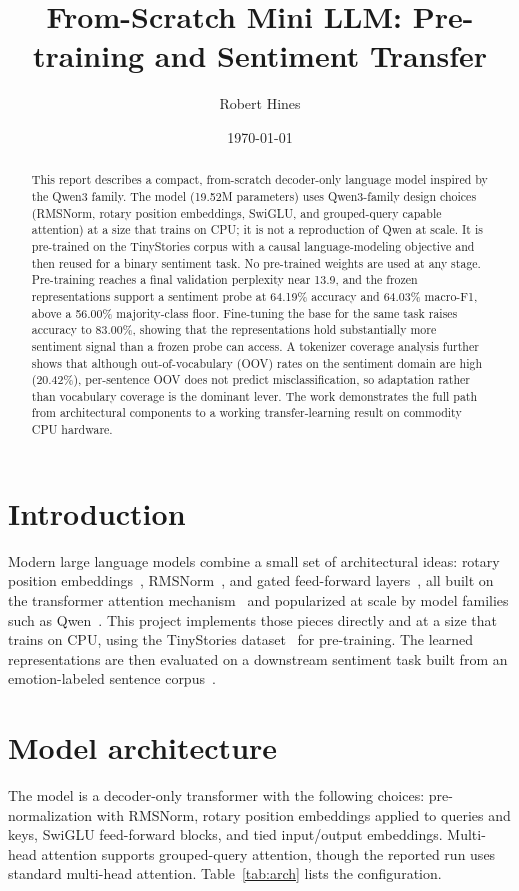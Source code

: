 \documentclass[11pt]{article}
\title{From-Scratch Mini LLM: Pre-training and Sentiment Transfer}
\author{Robert Hines}
\date{\today}
\begin{document}
\maketitle

\begin{abstract}
This report describes a compact, from-scratch decoder-only language model
inspired by the Qwen3 family. The model (19.52M parameters) uses Qwen3-family
design choices (RMSNorm, rotary position embeddings, SwiGLU, and grouped-query
capable attention) at a size that trains on CPU; it is not a reproduction of Qwen
at scale. It is pre-trained on the TinyStories corpus with a causal
language-modeling objective and then reused for a binary sentiment task. No
pre-trained weights are used at any stage.
Pre-training reaches a final validation perplexity near 13.9, and the frozen
representations support a sentiment probe at 64.19\% accuracy and 64.03\%
macro-F1, above a 56.00\% majority-class floor. Fine-tuning the base for the same
task raises accuracy to 83.00\%, showing that the representations hold
substantially more sentiment signal than a frozen probe can access. A tokenizer
coverage analysis further shows that although out-of-vocabulary (OOV) rates on
the sentiment domain are high (20.42\%), per-sentence OOV does not predict
misclassification, so adaptation rather than vocabulary coverage is the dominant
lever. The work demonstrates the full path from architectural components to a
working transfer-learning result on commodity CPU hardware.
\end{abstract}

\section{Introduction}
Modern large language models combine a small set of architectural ideas: rotary
position embeddings~\cite{su2021roformer}, RMSNorm~\cite{zhang2019rmsnorm}, and
gated feed-forward layers~\cite{shazeer2020glu}, all built on the transformer
attention mechanism~\cite{vaswani2017attention} and popularized at scale by model
families such as Qwen~\cite{yang2024qwen2}. This project implements those pieces
directly and at a size that trains on CPU, using the TinyStories
dataset~\cite{eldan2023tinystories} for pre-training. The learned representations
are then evaluated on a downstream sentiment task built from an emotion-labeled
sentence corpus~\cite{saravia2018carer}.

\section{Model architecture}
The model is a decoder-only transformer with the following choices:
pre-normalization with RMSNorm, rotary position embeddings applied to queries and
keys, SwiGLU feed-forward blocks, and tied input/output embeddings. Multi-head
attention supports grouped-query attention, though the reported run uses standard
multi-head attention. Table~\ref{tab:arch} lists the configuration.
\end{document}
